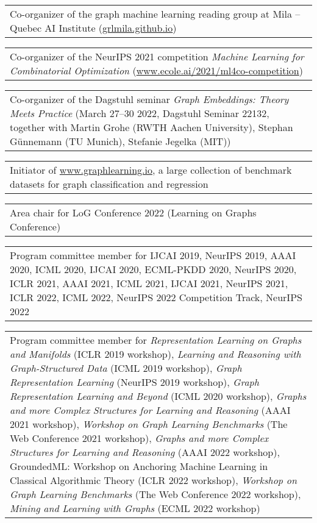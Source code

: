 \documentclass[11pt, a4paper, DIV=12]{scrartcl}
\begin{document}
\begin{tabular}{p{14.5cm}}
	Co-organizer of the graph machine learning reading group at Mila -- Quebec AI Institute (\url{grlmila.github.io}) \\[0.5em]	
\end{tabular}

\begin{tabular}{p{14.5cm}}
Co-organizer of the NeurIPS 2021 competition \emph{Machine Learning for Combinatorial Optimization} (\url{www.ecole.ai/2021/ml4co-competition}) \\[0.5em]	
\end{tabular}

\begin{tabular}{p{14.5cm}}
Co-organizer of the Dagstuhl seminar \emph{Graph Embeddings: Theory Meets Practice} (March 27–30 2022, Dagstuhl Seminar 22132, together with Martin Grohe (RWTH Aachen University), Stephan Günnemann (TU Munich), Stefanie Jegelka (MIT)) \\[0.5em]
\end{tabular}

\begin{tabular}{p{14.5cm}}
Initiator of \url{www.graphlearning.io}, a large collection of benchmark datasets for graph classification and regression\\[0.5em]
\end{tabular}

\begin{tabular}{p{14.5cm}}	
Area chair for LoG Conference 2022 (Learning on Graphs Conference) 
  \\[0.5em]
\end{tabular}


\begin{tabular}{p{14.5cm}}	
Program committee member for IJCAI 2019, NeurIPS  2019, AAAI 2020, ICML 2020, IJCAI 2020, ECML-PKDD 2020, NeurIPS 2020, ICLR 2021, AAAI 2021, ICML 2021, IJCAI 2021,  NeurIPS 2021, ICLR 2022, ICML 2022, NeurIPS 2022 Competition Track, NeurIPS 2022  \\[0.5em]
\end{tabular}

\begin{tabular}{p{14.5cm}}
Program committee member for \emph{Representation Learning on Graphs and Manifolds} (ICLR 2019 workshop), \emph{Learning and Reasoning with Graph-Structured Data} (ICML 2019 workshop), \emph{Graph Representation Learning} (NeurIPS 2019 workshop), \emph{Graph Representation Learning and Beyond} (ICML 2020 workshop), \emph{Graphs and more Complex Structures for Learning and Reasoning} (AAAI 2021 workshop), \emph{Workshop on Graph Learning Benchmarks} (The Web Conference 2021 workshop),  \emph{Graphs and more Complex Structures for Learning and Reasoning} (AAAI 2022 workshop), GroundedML: Workshop on Anchoring Machine Learning in Classical Algorithmic Theory (ICLR 2022 workshop), \emph{Workshop on Graph Learning Benchmarks} (The Web Conference 2022 workshop), \emph{Mining and
Learning with Graphs} (ECML 2022 workshop) 


 \\[0.5em]
\end{tabular}
\end{document}
